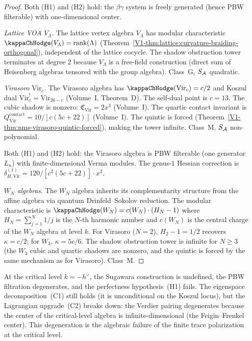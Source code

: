 \begin{proof}
Both (H1) and (H2) hold: the $\beta\gamma$ system is
freely generated (hence PBW filterable) with
one-dimensional center.

\emph{Lattice VOA $V_\Lambda$.}
The lattice vertex algebra $V_\Lambda$ has modular
characteristic $\kappaChHodge(V_\Lambda) = \rank(\Lambda)$
(Theorem~\ref{V1-thm:lattice:curvature-braiding-orthogonal}),
independent of the lattice cocycle.
The shadow obstruction tower terminates at degree $2$ because
$V_\Lambda$ is a free-field construction (direct sum
of Heisenberg algebras tensored with the group algebra).
Class~G, $S_{\mathcal{A}}$ quadratic.

\emph{Virasoro $\mathrm{Vir}_c$.}
The Virasoro algebra has $\kappaChHodge(\mathrm{Vir}_c) = c/2$
and Koszul dual $\mathrm{Vir}_c^! = \mathrm{Vir}_{26-c}$
(Volume~I, Theorem~D).
The self-dual point is $c = 13$.
The cubic shadow is nonzero: $\mathfrak{C}_{\mathrm{Vir}} =
2x^3$ (Volume~I).
The quartic contact invariant is
$Q_{\mathrm{Vir}}^{\mathrm{contact}} = 10/[c(5c+22)]$
(Volume~I).
The quintic is forced
(Theorem~\ref{V1-thm:nms-virasoro-quintic-forced}), making the
tower infinite. Class~M, $S_{\mathcal{A}}$ non-polynomial.

Both (H1) and (H2) hold: the Virasoro algebra is
PBW filterable (one generator $L_n$) with finite-dimensional
Verma modules. The genus-$1$ Hessian correction is
$\delta_{H,\mathrm{Vir}}^{(1)}
= 120 / [c^2(5c+22)] \cdot x^2$.

\emph{$W_N$ algebras.}
The $W_N$ algebra inherits its complementarity structure
from the affine algebra via quantum Drinfeld--Sokolov
reduction. The modular characteristic is
$\kappaChHodge(W_N) = c(W_N) \cdot (H_N - 1)$ where $H_N = \sum_{j=1}^{N} 1/j$
is the $N$-th harmonic number and $c(W_N)$ is the central
charge of the $W_N$ algebra at level $k$.
For Virasoro ($N=2$), $H_2 - 1 = 1/2$ recovers $\kappa = c/2$;
for $W_3$, $\kappa = 5c/6$.
The shadow obstruction tower is infinite for $N \ge 3$ (the $W_3$ cubic
and quartic shadows are nonzero, and the quintic is forced
by the same mechanism as for Virasoro). Class~M.
\end{proof}

\begin{remark}
At the critical level $k = -h^{\vee}$, the Sugawara
construction is undefined, the PBW filtration degenerates,
and the perfectness hypothesis~(H1) fails. The eigenspace
decomposition~(C1) still holds (it is unconditional on the
Koszul locus), but the Lagrangian upgrade~(C2) breaks down:
the Verdier pairing degenerates because the center of the
critical-level algebra is infinite-dimensional (the
Feigin--Frenkel center). This degeneration is the algebraic
failure of the finite trace polarization at the critical level.
\end{remark}

